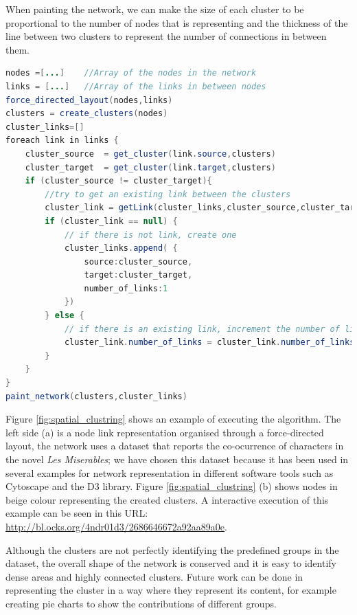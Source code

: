 When painting the network, we can make the size of each cluster to be proportional to the number of nodes that is representing and the thickness of the line between two clusters to represent the number of connections in between them.
\newpage
\begin{lstlisting}[language=java]%,float,floatplacement=H]
nodes =[...]	//Array of the nodes in the network
links = [...]	//Array of the links in between nodes
force_directed_layout(nodes,links) 
clusters = create_clusters(nodes)
cluster_links=[]
foreach link in links {
	cluster_source	= get_cluster(link.source,clusters)
	cluster_target	= get_cluster(link.target,clusters)
	if (cluster_source != cluster_target){
		//try to get an existing link between the clusters
		cluster_link = getLink(cluster_links,cluster_source,cluster_target) 
		if (cluster_link == null) {
			// if there is not link, create one
			cluster_links.append( {
				source:cluster_source, 
				target:cluster_target, 
				number_of_links:1
			})
		} else {
			// if there is an existing link, increment the number of links between the clusters
			cluster_link.number_of_links = cluster_link.number_of_links +1
		}
	}
}
paint_network(clusters,cluster_links)
\end{lstlisting}

Figure \ref{fig:spatial_clustring} shows an example of executing the algorithm. The left side (a) is a node link representation organised through a force-directed layout, the network uses a dataset that reports the co-ocurrence of characters in the novel \emph{Les Miserables}; we have chosen this dataset because it has been used in several examples for network representation in different software tools such as Cytoscape and the D3 library. Figure \ref{fig:spatial_clustring} (b) shows nodes in beige colour representing the created clusters. A interactive execution of this example can be seen in this URL: \url{http://bl.ocks.org/4ndr01d3/2686646672a92aa89a0e}. 

Although the clusters are not perfectly identifying the predefined groups in the dataset, the overall shape of the network is conserved and it is easy to identify  dense areas and highly connected clusters. Future work can be done in representing the cluster in a way where they represent its content, for example creating pie charts to show the contributions of different groups.

